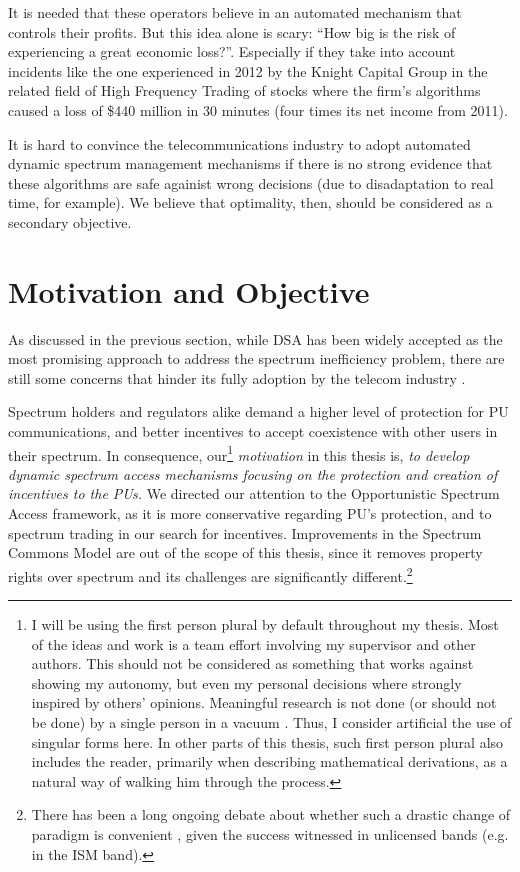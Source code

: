 It is needed that these operators believe in an automated mechanism that controls their profits. But this idea alone is scary: \enquote{How big is the risk of experiencing a great economic loss?}. Especially if they take into account incidents like the one experienced in 2012 by the Knight Capital Group in the related
field of High Frequency Trading of stocks \cite{web:Silver2012} where the firm's algorithms caused a loss of \$440 million in 30 minutes (four times its net income from 2011).

It is hard to convince the telecommunications industry to adopt automated dynamic spectrum management mechanisms if there is no strong evidence that these algorithms are safe againist wrong decisions (due to disadaptation to real time, for example). We believe that optimality, then, should be considered as a secondary objective.

\section{Motivation and Objective}

As discussed in the previous section, while DSA has been widely accepted as the most promising approach to address the spectrum inefficiency problem, there are still some concerns that hinder its fully adoption by the telecom industry \cite{ref:Kelly2012}.

Spectrum holders and regulators alike demand a higher level of protection for PU communications, and better incentives to accept coexistence with other users in their spectrum. In consequence, our\footnote{I will be using the first person plural by default throughout my thesis. Most of the ideas and work is a team effort involving my supervisor and other authors. This should not be considered as something that works against showing my autonomy, but even my personal decisions where strongly inspired by others' opinions. Meaningful research is not done (or should not be done) by a single person in a vacuum \cite{ref:Mihaly2013}. Thus, I consider artificial the use of singular forms here. In other parts of this thesis, such first person plural also includes the reader, primarily when describing mathematical derivations, as a natural way of walking him through the process.} \emph{motivation} in this thesis is, \emph{to develop dynamic spectrum access mechanisms focusing on the protection and creation of incentives to the PUs.} We directed our attention to the Opportunistic Spectrum Access framework, as it is more conservative regarding PU's protection, and to spectrum trading in our search for incentives.
Improvements in the Spectrum Commons Model are out of the scope of this thesis, since it removes property rights over spectrum and its challenges are significantly different.\footnote{There has been a long ongoing debate about whether such a drastic change of paradigm is convenient \cite{ref:Peha2005}, given the success witnessed in unlicensed bands (e.g. in the ISM band).}

